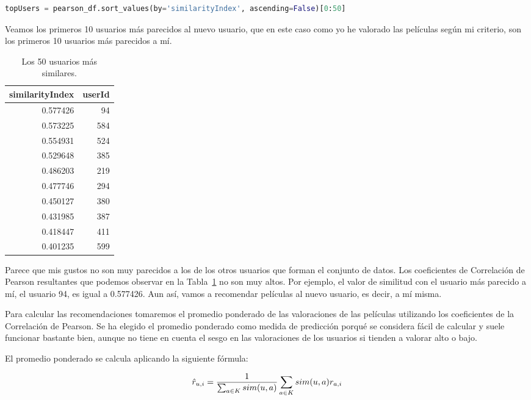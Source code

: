 \documentclass{uimppracticas}
\begin{document}
\begin{lstlisting}[language=python, basicstyle=\small]
topUsers = pearson_df.sort_values(by='similarityIndex', ascending=False)[0:50]
\end{lstlisting}

Veamos los primeros 10 usuarios más parecidos al nuevo usuario, que en este caso como yo he valorado las películas según mi criterio, son los primeros 10 usuarios más parecidos a mí.

\begin{table}[h]
	\centering
	\begin{tabular}{rr}
		\toprule
		similarityIndex &  userId \\
		\midrule
		0.577426 &      94 \\
		0.573225 &     584 \\
		0.554931 &     524 \\
		0.529648 &     385 \\
		0.486203 &     219 \\
		0.477746 &     294 \\
		0.450127 &     380 \\
		0.431985 &     387 \\
		0.418447 &     411 \\
		0.401235 &     599 \\
		\bottomrule
	\end{tabular}
	\caption{Los 50 usuarios más similares.}
	\label{top_50}
\end{table}

Parece que mis gustos no son muy parecidos a los de los otros usuarios que forman el conjunto de datos. Los coeficientes de Correlación de Pearson resultantes que podemos observar en la Tabla~\ref{top_50} no son muy altos. Por ejemplo, el valor de similitud con el usuario más parecido a mí, el usuario 94, es igual a 0.577426. Aun así, vamos a recomendar películas al nuevo usuario, es decir, a mí misma.

Para calcular las recomendaciones tomaremos el promedio ponderado de las valoraciones de las películas utilizando los coeficientes de la Correlación de Pearson. Se ha elegido el promedio ponderado como medida de predicción porqué se considera fácil de calcular y suele funcionar bastante bien, aunque no tiene en cuenta el sesgo en las valoraciones de los usuarios si tienden a valorar alto o bajo. 

El promedio ponderado se calcula aplicando la siguiente fórmula:

\begin{equation}\label{promedio_ponderado}
	\large \hat{r}_{u,i} = \frac{1}{\sum_{a\in K}sim(u,a)} \sum_{a\in K }sim(u,a) r_{a,i}
\end{equation}
\end{document}
